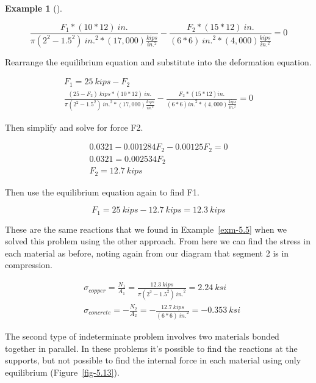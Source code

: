 \documentclass[
  letterpaper,
  DIV=11,
  numbers=noendperiod]{scrreprt}
\theoremstyle{definition}
\newtheorem{example}{Example}[chapter]
\theoremstyle{remark}
\begin{document}
\begin{tcolorbox}
\begin{example}[]
\begin{tcolorbox}
\[
\frac{F_1 *(10 * 12){~in.}}{\pi(2^2-1.5^2){~in.}^2 *(17,000)\frac{kips}{in.^2}}-\frac{F_2 *(15 * 12){~in.}}{(6 * 6){~in.}^2 *(4,000)\frac{kips}{in.^2}}=0
\]

Rearrange the equilibrium equation and substitute into the deformation
equation.

\[
\begin{gathered}
F_1=25{~kips}-F_2 \\
\frac{(25-F_2){~kips} *(10 * 12){~in.}}{\pi(2^2-1.5^2){~in.}^2 *(17,000)\frac{kips}{in.^2}}-\frac{F_2 *(15 * 12){in.}}{(6 * 6){in.}^2 *(4,000)\frac{kips}{in.^2}}=0
\end{gathered}
\]

Then simplify and solve for force F2.

\[
\begin{gathered}
0.0321-0.001284 F_2-0.00125 F_2=0 \\
0.0321=0.002534 F_2 \\
F_2=12.7 {~kips}
\end{gathered}
\]

Then use the equilibrium equation again to find F1.

\[
F_1=25{~kips}-12.7{~kips}=12.3{~kips}
\]

These are the same reactions that we found in Example~\ref{exm-5.5} when
we solved this problem using the other approach. From here we can find
the stress in each material as before, noting again from our diagram
that segment 2 is in compression.

\[
\begin{aligned}
& \sigma_{copper}=\frac{N_1}{A_1}=\frac{12.3{~kips}}{\pi(2^2-1.5^2){~in.}^2}=2.24 {~ksi} \\
& \sigma_{concrete}=-\frac{N_2}{A_2}=-\frac{12.7{~kips}}{(6 * 6){~in.}^2}=-0.353 {~ksi}
\end{aligned}
\]

\end{tcolorbox}

\end{example}

\end{tcolorbox}

The second type of indeterminate problem involves two materials bonded
together in parallel. In these problems it's possible to find the
reactions at the supports, but not possible to find the internal force
in each material using only equilibrium (Figure~\ref{fig-5.13}).
\end{document}
